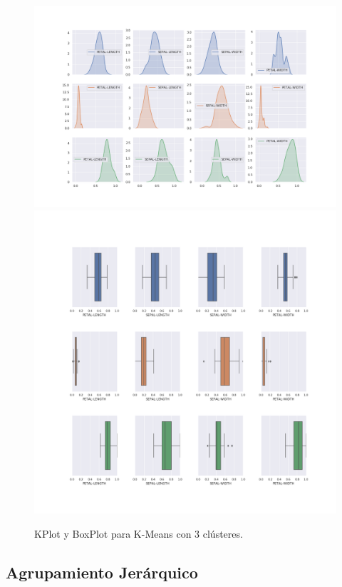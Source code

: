 \documentclass[a4paper, 20pt]{article}
\begin{document}
\begin{figure}[h]
\centering
\includegraphics[scale=0.41]{dani/kdeplotK-MeansIRIS.png}
\includegraphics[scale=0.31]{dani/boxplotK-MeansIRIS.png}
\caption{KPlot y BoxPlot para K-Means con 3 clústeres.}
\label{kpkm}
\end{figure}

\clearpage

\subsection{Agrupamiento Jerárquico}
\end{document}
